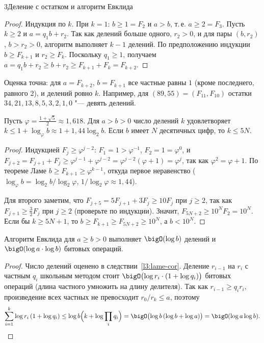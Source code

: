 \begin{lecture}{3}{Деление с остатком и алгоритм Евклида}
\begin{proof}
Индукция по $k$. При $k = 1$: $b \ge 1 = F_2$ и $a > b$, т.\,е. $a \ge 2 = F_3$. Пусть $k \ge 2$ и
$a = q_1 b + r_2$. Так как делений больше одного, $r_2 > 0$, и для пары $(b, r_2)$, $b > r_2 > 0$,
алгоритм выполняет $k - 1$ делений. По предположению индукции $b \ge F_{k+1}$ и $r_2 \ge F_k$.
Поскольку $q_1 \ge 1$, получаем $a = q_1 b + r_2 \ge b + r_2 \ge F_{k+1} + F_k = F_{k+2}$.
\end{proof}

Оценка точна: для $a = F_{k+2}$, $b = F_{k+1}$ все частные равны $1$ (кроме последнего, равного $2$),
и делений ровно $k$. Например, для $(89, 55) = (F_{11}, F_{10})$ остатки
$34, 21, 13, 8, 5, 3, 2, 1, 0$ "--- девять делений.

\begin{corollary}\label{l3:lame-cor}
Пусть $\varphi = \frac{1 + \sqrt 5}{2} \approx 1{,}618$. Для $a > b > 0$ число делений $k$
удовлетворяет $k \le 1 + \log_\varphi b \approx 1 + 1{,}44 \log_2 b$. Если $b$ имеет $N$ десятичных
цифр, то $k \le 5N$.
\end{corollary}

\begin{proof}
Индукцией $F_j \ge \varphi^{j-2}$: $F_1 = 1 > \varphi^{-1}$, $F_2 = 1 = \varphi^0$, и
$F_{j+2} = F_{j+1} + F_j \ge \varphi^{j-1} + \varphi^{j-2} = \varphi^{j-2}(\varphi + 1) = \varphi^j$,
так как $\varphi^2 = \varphi + 1$. По теореме Ламе $b \ge F_{k+1} \ge \varphi^{k-1}$, откуда
первое неравенство ($\log_\varphi b = \log_2 b / \log_2 \varphi$, $1/\log_2\varphi \approx 1{,}44$).

Для второго заметим, что $F_{j+5} = 5F_{j+1} + 3F_j \ge 10 F_j$ при $j \ge 2$, так как
$F_{j+1} \ge \frac32 F_j$ при $j \ge 2$ (проверьте по индукции). Значит,
$F_{5N + 2} \ge 10^N F_2 = 10^N$. Если бы $k \ge 5N + 1$, то $b \ge F_{k+1} \ge F_{5N+2} \ge 10^N$,
а $b < 10^N$.
\end{proof}

\begin{theorem}\label{l3:euclid-cost}
Алгоритм Евклида для $a \ge b > 0$ выполняет $\bigO(\log b)$ делений и $\bigO(\log a \cdot \log b)$
битовых операций.
\end{theorem}

\begin{proof}
Число делений оценено в следствии~\ref{l3:lame-cor}. Деление $r_{i-1}$ на $r_i$ с частным $q_i$
школьным методом стоит $\bigO\bigl(\log r_i \cdot (1 + \log q_i)\bigr)$ битовых операций
(длина частного умножить на длину делителя). Так как $r_{i-1} \ge q_i r_i$, произведение всех
частных не превосходит $r_0 / r_k \le a$, поэтому
\[
  \sum_{i=1}^{k} \log r_i \,(1 + \log q_i) \le \log b \Bigl(k + \log \prod_i q_i\Bigr)
  = \bigO\bigl(\log b\,(\log b + \log a)\bigr) = \bigO(\log a \log b). \qedhere
\]
\end{proof}


\end{lecture}
